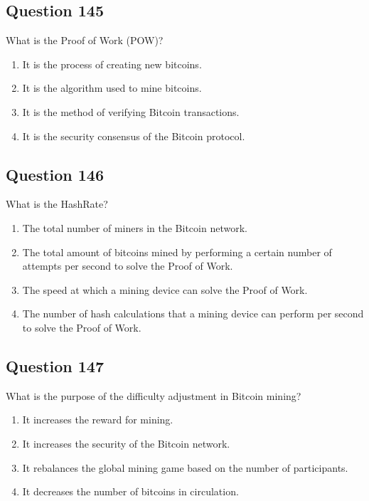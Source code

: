 \documentclass[12pt,a4paper]{article}
\begin{document}
\bigskip


\subsection*{Question 145}
What is the Proof of Work (POW)?

\begin{enumerate}[label=\Alph*., leftmargin=*]
\item It is the process of creating new bitcoins.
\item It is the algorithm used to mine bitcoins.
\item It is the method of verifying Bitcoin transactions.
\item It is the security consensus of the Bitcoin protocol.
\end{enumerate}

\bigskip


\subsection*{Question 146}
What is the HashRate?

\begin{enumerate}[label=\Alph*., leftmargin=*]
\item The total number of miners in the Bitcoin network.
\item The total amount of bitcoins mined by performing a certain number of attempts per second to solve the Proof of Work.
\item The speed at which a mining device can solve the Proof of Work.
\item The number of hash calculations that a mining device can perform per second to solve the Proof of Work.
\end{enumerate}

\bigskip


\subsection*{Question 147}
What is the purpose of the difficulty adjustment in Bitcoin mining?

\begin{enumerate}[label=\Alph*., leftmargin=*]
\item It increases the reward for mining.
\item It increases the security of the Bitcoin network.
\item It rebalances the global mining game based on the number of participants.
\item It decreases the number of bitcoins in circulation.
\end{enumerate}
\end{document}
